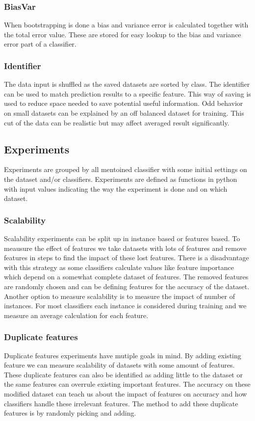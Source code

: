 \documentclass[a4paper,10pt]{article}
\begin{document}
\subsubsection{BiasVar}
When bootstrapping is done a bias and variance error is calculated together with the total error value. These are stored for easy lookup to the bias and variance error part of a classifier.

\subsubsection{Identifier}
The data input is shuffled as the saved datasets are sorted by class. The identifier can be used to match prediction results to a specific feature. This way of saving is used to reduce space needed to save potential useful information. Odd behavior on small datasets can be explained by an off balanced dataset for training. This cut of the data can be realistic but may affect averaged result significantly. 

\subsection{Experiments}
Experiments are grouped by all mentoined classifier with some initial settings on the dataset and/or classifiers. Experiments are defined as functions in python with input values indicating the way the experiment is done and on which dataset.
\subsubsection{Scalability}
Scalability experiments can be split up in instance based or features based. To meausure the effect of features we take datasets with lots of features and remove features in steps to find the impact of these lost features. There is a disadvantage with this strategy as some classifiers calculate values like feature importance which depend on a somewhat complete dataset of features. The removed features are randomly chosen and can be defining features for the accuracy of the dataset. 
Another option  to measure scalability is to measure the impact of number of instances. For most classifiers each instance is considered during training and we measure an average calculation for each feature. 

\subsubsection{Duplicate features}
Duplicate features experiments have mutiple goals in mind. By adding existing feature we can measure scalability of datasets with some amount of features. These duplicate features can also be identified as adding little to the dataset or the same features can overrule existing important features. The accuracy on these modified dataset
can teach us about the impact of features on accuracy and how classifiers handle these irrelevant features. The method to add these duplicate features is by randomly picking and adding. 
\end{document}

